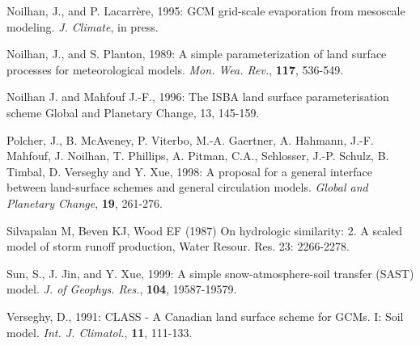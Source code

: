 \begin{description}
\item
Noilhan, J., and P. Lacarr\`ere, 1995:
GCM grid-scale evaporation from mesoscale modeling.
{\em J. Climate},
in press.

\item
Noilhan, J., and S. Planton, 1989:
A simple parameterization of land surface processes for
meteorological models.
{\em Mon. Wea. Rev.}, {\bf 117}, 536-549.

\item
Noilhan J. and Mahfouf J.-F., 1996: The ISBA land surface parameterisation scheme Global and Planetary Change, 13, 145-159.

\item
Polcher, J., B. McAveney, P. Viterbo, M.-A. Gaertner, A. Hahmann, J.-F. Mahfouf, J. Noilhan, T. Phillips, A. Pitman, C.A., Schlosser, J.-P. Schulz, B. Timbal, D. Verseghy and Y. Xue, 1998:
A proposal for a general interface between land-surface schemes and
general circulation models.
{\em Global and Planetary Change}, {\bf 19}, 261-276.

\item
Silvapalan M, Beven KJ, Wood EF (1987) On hydrologic similarity: 2. A scaled model of 
storm runoff production, Water Resour. Res. 23: 2266-2278.

\item
Sun, S.,
J. Jin, and Y. Xue, 1999:
A simple snow-atmosphere-soil transfer (SAST) model.
{\em J. of Geophys. Res.},
{\bf 104},
19587-19579.

\item
Verseghy, D., 1991:
CLASS - A Canadian land surface scheme for GCMs.
I:  Soil model.
{\em Int. J. Climatol.},
{\bf 11},
111-133.

\end{description}

